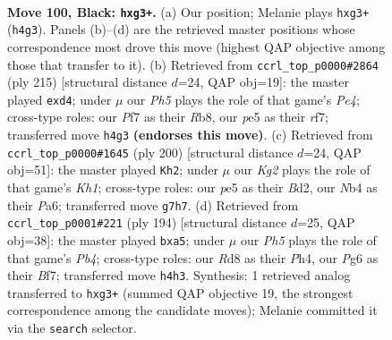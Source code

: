 \documentclass[11pt]{article}
\begin{document}
\clearpage

\begin{figure}[p]\centering
\begin{subfigure}{0.46\textwidth}\centering
\resizebox{\linewidth}{!}{%
\newchessgame
\chessboard[
  setfen={3r4/5pk1/6p1/4P3/1n3P1p/1B4P1/5K2/8 b - - 0 100},
  showmover=false,
  pgfstyle=straightmove, color=movearrow, markmove={h4-g3}
]}
\caption{}
\end{subfigure}\hfill
\begin{subfigure}{0.46\textwidth}\centering
\resizebox{\linewidth}{!}{%
\newchessgame
\chessboard[
  setfen={1r6/5R2/7k/4p1p1/pPKB4/P7/8/8 b - - 0 108},
  showmover=false,
  pgfstyle=straightmove, color=movearrow, markmove={e5-d4}
]}
\caption{}
\end{subfigure}
\\[4pt]
\begin{subfigure}{0.46\textwidth}\centering
\resizebox{\linewidth}{!}{%
\newchessgame
\chessboard[
  setfen={8/8/P1b4p/2P2kp1/5p1P/8/3B2P1/7K w - - 2 101},
  showmover=false,
  pgfstyle=straightmove, color=movearrow, markmove={h1-h2}
]}
\caption{}
\end{subfigure}\hfill
\begin{subfigure}{0.46\textwidth}\centering
\resizebox{\linewidth}{!}{%
\newchessgame
\chessboard[
  setfen={2b5/5Bp1/5p2/p7/1P1k1P1P/K7/8/8 w - - 0 98},
  showmover=false,
  pgfstyle=straightmove, color=movearrow, markmove={b4-a5}
]}
\caption{}
\end{subfigure}
\caption{\textbf{Move 100, Black: \texttt{hxg3+}.} (a) Our position; Melanie plays \texttt{hxg3+} (\texttt{h4g3}). Panels (b)--(d) are the retrieved master positions whose correspondence most drove this move (highest QAP objective among those that transfer to it). (b) Retrieved from \texttt{ccrl\_top\_p0000\#2864} (ply 215) [structural distance $d$=24, QAP obj=19]: the master played \texttt{exd4}; under $\mu$ our \emph{Ph5} plays the role of that game's \emph{Pe4}; cross-type roles: our \emph{P}f7 as their \emph{R}b8, our \emph{p}e5 as their \emph{r}f7; transferred move \texttt{h4g3} \textbf{(endorses this move)}. (c) Retrieved from \texttt{ccrl\_top\_p0000\#1645} (ply 200) [structural distance $d$=24, QAP obj=51]: the master played \texttt{Kh2}; under $\mu$ our \emph{Kg2} plays the role of that game's \emph{Kh1}; cross-type roles: our \emph{p}e5 as their \emph{B}d2, our \emph{N}b4 as their \emph{P}a6; transferred move \texttt{g7h7}. (d) Retrieved from \texttt{ccrl\_top\_p0001\#221} (ply 194) [structural distance $d$=25, QAP obj=38]: the master played \texttt{bxa5}; under $\mu$ our \emph{Ph5} plays the role of that game's \emph{Pb4}; cross-type roles: our \emph{R}d8 as their \emph{P}h4, our \emph{P}g6 as their \emph{B}f7; transferred move \texttt{h4h3}. Synthesis: 1 retrieved analog transferred to \texttt{hxg3+} (summed QAP objective 19, the strongest correspondence among the candidate moves); Melanie committed it via the \texttt{search} selector.}
\label{fig:thought-m199}
\end{figure}
\end{document}
